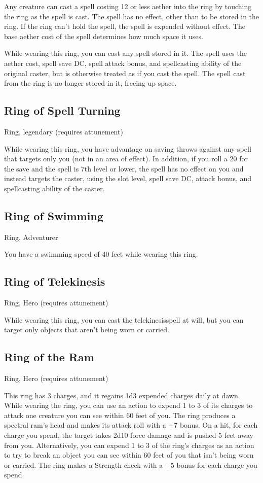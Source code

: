 Any creature can cast a spell costing 12 or less aether into the ring by touching the ring as the spell is cast. The spell has no effect, other than to be stored in the ring. If the ring can't hold the spell, the spell is expended without effect. The base aether cost of the spell determines how much space it uses.

While wearing this ring, you can cast any spell stored in it. The spell uses the aether cost, spell save DC, spell attack bonus, and spellcasting ability of the original caster, but is otherwise treated as if you cast the spell. The spell cast from the ring is no longer stored in it, freeing up space.

\subsection{Ring of Spell Turning}
Ring, legendary (requires attunement)

While wearing this ring, you have advantage on saving throws against any spell that targets only you (not in an area of effect). In addition, if you roll a 20 for the save and the spell is 7th level or lower, the spell has no effect on you and instead targets the caster, using the slot level, spell save DC, attack bonus, and spellcasting ability of the caster.

\subsection{Ring of Swimming}
Ring, Adventurer 

You have a swimming speed of 40 feet while wearing this ring.

\subsection{Ring of Telekinesis}
Ring, Hero (requires attunement) 

While wearing this ring, you can cast the telekinesisspell at will, but you can target only objects that aren't being worn or carried.

\subsection{Ring of the Ram}
Ring, Hero (requires attunement) 

This ring has 3 charges, and it regains 1d3 expended charges daily at dawn. While wearing the ring, you can use an action to expend 1 to 3 of its charges to attack one creature you can see within 60 feet of you. The ring produces a spectral ram's head and makes its attack roll with a +7 bonus. On a hit, for each charge you spend, the target takes 2d10 force damage and is pushed 5 feet away from you.  Alternatively, you can expend 1 to 3 of the ring's charges as an action to try to break an object you can see within 60 feet of you that isn't being worn or carried. The ring makes a Strength check with a +5 bonus for each charge you spend.

